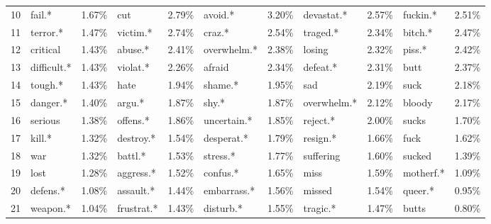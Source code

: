 \begin{tabular}{lllllllllll}
10                   &           fail.* &     1.67\% &                cut &           2.79\% &      avoid.* &     3.20\% &    devastat.* &     2.57\% &         fuckin.* &            2.51\% \\
11                   &         terror.* &     1.47\% &           victim.* &           2.74\% &       craz.* &     2.54\% &      traged.* &     2.34\% &          bitch.* &            2.47\% \\
12                   &         critical &     1.43\% &            abuse.* &           2.41\% &  overwhelm.* &     2.38\% &        losing &     2.32\% &           piss.* &            2.42\% \\
13                   &      difficult.* &     1.43\% &           violat.* &           2.26\% &       afraid &     2.34\% &      defeat.* &     2.31\% &             butt &            2.37\% \\
14                   &          tough.* &     1.43\% &               hate &           1.94\% &      shame.* &     1.95\% &           sad &     2.19\% &             suck &            2.18\% \\
15                   &         danger.* &     1.40\% &             argu.* &           1.87\% &        shy.* &     1.87\% &   overwhelm.* &     2.12\% &           bloody &            2.17\% \\
16                   &          serious &     1.38\% &           offens.* &           1.86\% &  uncertain.* &     1.85\% &      reject.* &     2.00\% &            sucks &            1.70\% \\
17                   &           kill.* &     1.32\% &          destroy.* &           1.54\% &   desperat.* &     1.79\% &      resign.* &     1.66\% &             fuck &            1.62\% \\
18                   &              war &     1.32\% &            battl.* &           1.53\% &     stress.* &     1.77\% &     suffering &     1.60\% &           sucked &            1.39\% \\
19                   &             lost &     1.28\% &          aggress.* &           1.52\% &     confus.* &     1.65\% &          miss &     1.59\% &        motherf.* &            1.09\% \\
20                   &         defens.* &     1.08\% &          assault.* &           1.44\% &  embarrass.* &     1.56\% &        missed &     1.54\% &          queer.* &            0.95\% \\
21                   &         weapon.* &     1.04\% &         frustrat.* &           1.43\% &    disturb.* &     1.55\% &      tragic.* &     1.47\% &            butts &            0.80\% \\

\end{tabular}
